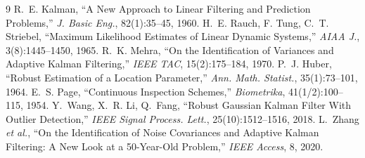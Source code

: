 \documentclass[10pt,twocolumn]{article}
\begin{document}
\begin{thebibliography}{9}
\small
{} R.~E. Kalman, ``A New Approach to Linear Filtering and
Prediction Problems,'' \emph{J. Basic Eng.}, 82(1):35--45, 1960.
 H.~E. Rauch, F. Tung, C.~T. Striebel, ``Maximum Likelihood
Estimates of Linear Dynamic Systems,'' \emph{AIAA J.}, 3(8):1445--1450, 1965.
 R.~K. Mehra, ``On the Identification of Variances and
Adaptive Kalman Filtering,'' \emph{IEEE TAC}, 15(2):175--184, 1970.
 P.~J. Huber, ``Robust Estimation of a Location Parameter,''
\emph{Ann. Math. Statist.}, 35(1):73--101, 1964.
 E.~S. Page, ``Continuous Inspection Schemes,''
\emph{Biometrika}, 41(1/2):100--115, 1954.
 Y.~Wang, X.~R. Li, Q.~Fang, ``Robust Gaussian Kalman Filter
With Outlier Detection,'' \emph{IEEE Signal Process. Lett.}, 25(10):1512--1516,
2018.
 L.~Zhang \emph{et al.}, ``On the Identification of Noise
Covariances and Adaptive Kalman Filtering: A New Look at a 50-Year-Old Problem,''
\emph{IEEE Access}, 8, 2020.
\end{thebibliography}
\end{document}
